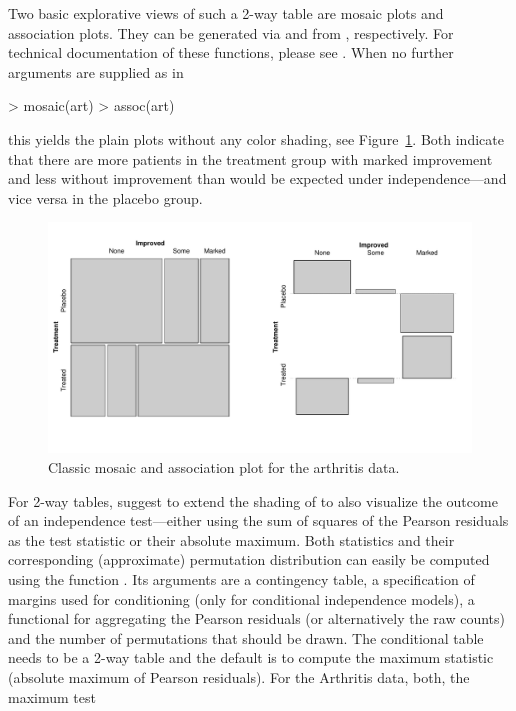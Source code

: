 \documentclass{Z}
\begin{document}
Two basic explorative views of such a 2-way table are mosaic plots and association plots.
They can be generated via  and  from , respectively.
For technical documentation of these functions, please see \cite{vcd:Meyer+Zeileis+Hornik:2006b}.
When no further arguments are supplied as in

\begin{Schunk}
\begin{Sinput}
> mosaic(art)
> assoc(art)
\end{Sinput}
\end{Schunk}

this yields the plain plots without any color shading, see Figure~\ref{fig:classic}.
Both indicate that there are more patients in the treatment group with marked improvement
and less without improvement than would be expected under independence---and vice versa
in the placebo group.

\begin{figure}[b!]
\begin{center}
\includegraphics{residual-shadings-Arthritis-classic1}
\caption{Classic mosaic and association plot for the arthritis data.}
\label{fig:classic}
\end{center}
\end{figure}

For 2-way tables, \cite{vcd:Zeileis+Meyer+Hornik:2005} suggest to extend the
shading of \cite{vcd:Friendly:1994} to also visualize the outcome of an independence
test---either using the sum of squares of the Pearson residuals as the test statistic
or their absolute maximum. Both statistics and their corresponding (approximate) permutation
distribution can easily be computed using the function . Its arguments
are a contingency table, a specification of margins used for conditioning (only for conditional
independence models), a functional for aggregating the Pearson residuals (or alternatively the
raw counts) and the number of permutations that should be drawn. The conditional table needs
to be a 2-way table and the default is to compute the maximum statistic (absolute maximum of
Pearson residuals). For the Arthritis data, both, the maximum test
\end{document}
